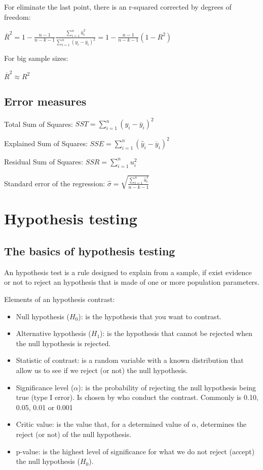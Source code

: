\documentclass[10pt,landscape]{article}
\begin{document}
\begin{multicols}{3}
For eliminate the last point, there is an r-squared corrected by degrees of freedom:

$\overline{R}^2 = 1 - \frac{n-1}{n-k-1} \frac{\sum_{i=1}^n \hat{u}_i^2}{\sum_{i=1}^n (y_i - \overline{y}_i)^2} = 1 - \frac{n-1}{n-k-1} (1-R^2)$

For big sample sizes:

$\overline{R}^2 \approx R^2$

\subsection*{Error measures}

Total Sum of Squares: $SST = \sum_{i=1}^n (y_i - \overline{y}_i)^2$

Explained Sum of Squares: $SSE = \sum_{i=1}^n (\hat{y}_i - \overline{y}_i)^2$

Residual Sum of Squares: $SSR = \sum_{i=1}^n u_i^2$

Standard error of the regression: $\hat{\sigma} = \sqrt{\frac{\sum_{i=1}^n \hat{u}_i^2}{n-k-1}}$

\section*{Hypothesis testing}

\subsection*{The basics of hypothesis testing}

An hypothesis test is a rule designed to explain from a sample, if exist evidence or not to reject an hypothesis that is made of one or more population parameters.

Elements of an hypothesis contrast:

\begin{itemize}[leftmargin=*]
\item Null hypothesis ($H_0$): is the hypothesis that you want to contrast.
\item Alternative hypothesis ($H_1$): is the hypothesis that cannot be rejected when the null hypothesis is rejected.
\item Statistic of contrast: is a random variable with a known distribution that allow us to see if we reject (or not) the null hypothesis.
\item Significance level ($\alpha$): is the probability of rejecting the null hypothesis being true (type I error). Is chosen by who conduct the contrast. Commonly is 0.10, 0.05, 0.01 or 0.001
\item Critic value: is the value that, for a determined value of $\alpha$, determines the reject (or not) of the null hypothesis.
\item p-value: is the highest level of significance for what we do not reject (accept) the null hypothesis ($H_0$).
\end{itemize}


\end{multicols}
\end{document}
